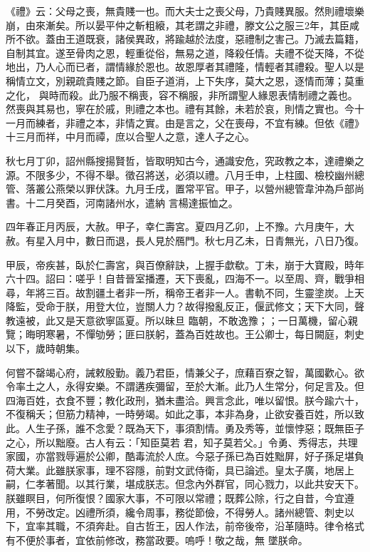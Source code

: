 \begin{pinyinscope}
 《禮》云：父母之喪，無貴賤一也。而大夫士之喪父母，乃貴賤異服。然則禮壞樂崩，由來漸矣。所以晏平仲之斬粗縗，其老謂之非禮，滕文公之服三2年，其臣咸所不欲。蓋由王道既衰，諸侯異政，將踰越於法度，惡禮制之害己。乃滅去篇籍，自制其宜。遂至骨肉之恩，輕重從俗，無易之道，降殺任情。夫禮不從天降，不從地出，乃人心而已者，謂情緣於恩也。故恩厚者其禮隆，情輕者其禮殺。聖人以是稱情立文，別親疏貴賤之節。自臣子道消，上下失序，莫大之恩，逐情而薄；莫重之化，
 與時而殺。此乃服不稱喪，容不稱服，非所謂聖人緣恩表情制禮之義也。然喪與其易也，寧在於戚，則禮之本也。禮有其餘，未若於哀，則情之實也。今十一月而練者，非禮之本，非情之實。由是言之，父在喪母，不宜有練。但依《禮》十三月而祥，中月而禫，庶以合聖人之意，達人子之心。



 秋七月丁卯，詔州縣搜揚賢哲，皆取明知古今，通識安危，究政教之本，達禮樂之源。不限多少，不得不舉。徵召將送，必須以禮。八月壬申，上柱國、檢校幽州總管、落叢公燕榮以罪伏誅。九月壬戌，置常平官。甲子，以營州總管韋沖為戶部尚書。十二月癸酉，河南諸州水，遣納
 言楊達振恤之。



 四年春正月丙辰，大赦。甲子，幸仁壽宮。夏四月乙卯，上不豫。六月庚午，大赦。有星入月中，數日而退，長人見於鴈門。秋七月乙未，日青無光，八日乃復。



 甲辰，帝疾甚，臥於仁壽宮，與百僚辭訣，上握手歔欷。丁未，崩于大寶殿，時年六十四。詔曰：嗟乎！自昔晉室播遷，天下喪亂，四海不一。以至周、齊，戰爭相尋，年將三百。故割疆土者非一所，稱帝王者非一人。書軌不同，生靈塗炭。上天降監，受命于朕，用登大位，豈關人力？故得撥亂反正，偃武修文；天下大同，聲教遠被，此又是天意欲寧區夏。所以昧旦
 臨朝，不敢逸豫；；一日萬機，留心親覽；晦明寒暑，不憚劬勞；匪曰朕躬，蓋為百姓故也。王公卿士，每日闕庭，刺史以下，歲時朝集。



 何嘗不罄竭心府，誡敕殷勤。義乃君臣，情兼父子，庶藉百寮之智，萬國歡心。欲令率土之人，永得安樂。不謂遘疾彌留，至於大漸。此乃人生常分，何足言及。但四海百姓，衣食不豐；教化政刑，猶未盡洽。興言念此，唯以留恨。朕今踰六十，不復稱夭；但筋力精神，一時勞竭。如此之事，本非為身，止欲安養百姓，所以致此。人生子孫，誰不念愛？既為天下，事須割情。勇及秀等，並懷悖惡；既無臣子之心，所以黜廢。古人有云：「知臣莫若
 君，知子莫若父。」令勇、秀得志，共理家國，亦當戮辱遍於公卿，酷毒流於人庶。今惡子孫已為百姓黜屏，好子孫足堪負荷大業。此雖朕家事，理不容隱，前對文武侍衛，具已論述。皇太子廣，地居上嗣，仁孝著聞。以其行業，堪成朕志。但念內外群官，同心戮力，以此共安天下。朕雖瞑目，何所復恨？國家大事，不可限以常禮；既葬公除，行之自昔，今宜遵用，不勞改定。凶禮所須，纔令周事，務從節儉，不得勞人。諸州總管、刺史以下，宜率其職，不須奔赴。自古哲王，因人作法，前帝後帝，沿革隨時。律令格式有不便於事者，宜依前修改，務當政要。嗚呼！敬之哉，無
 墜朕命。




\end{pinyinscope}
